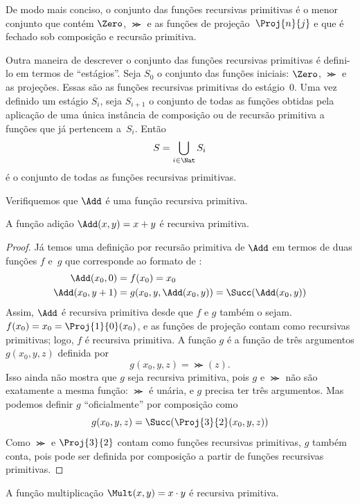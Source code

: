 \documentclass[../../../include/open-logic-section]{subfiles}
\begin{document}
\begin{explain}
De modo mais conciso, o conjunto das funções recursivas primitivas é o menor
conjunto que contém $\Zero$, $\Succ$ e as funções de
projeção~$\Proj{n}{j}$ e que é fechado sob composição e recursão primitiva.

Outra maneira de descrever o conjunto das funções recursivas primitivas é
defini-lo em termos de ``estágios''. Seja $S_0$ o conjunto das funções
iniciais: $\Zero$, $\Succ$ e as projeções. Essas são as funções recursivas
primitivas do estágio~$0$. Uma vez definido um estágio $S_i$, seja $S_{i+1}$
o conjunto de todas as funções obtidas pela aplicação de uma única instância
de composição ou de recursão primitiva a funções que já pertencem a~$S_i$.
Então
\[
S = \bigcup_{i \in \Nat} S_i
\]
é o conjunto de todas as funções recursivas primitivas.
\end{explain}

Verifiquemos que $\Add$ é uma função recursiva primitiva.

\begin{prop}
  A função adição $\Add(x,y) = x+y$ é recursiva primitiva.
\end{prop}

\begin{proof}
Já temos uma definição por recursão primitiva de $\Add$ em termos de duas
funções $f$ e~$g$ que corresponde ao formato de
:
\begin{align*}
  \Add(x_0, 0) & = f(x_0) = x_0\\
  \Add(x_0, y+1) & = g(x_0, y, \Add(x_0, y)) =
  \Succ(\Add(x_0, y))
\end{align*}
Assim, $\Add$ é recursiva primitiva desde que $f$ e $g$ também o sejam.
$f(x_0) = x_0 = \Proj{1}{0}(x_0)$, e as funções de projeção contam como
recursivas primitivas; logo, $f$ é recursiva primitiva. A função $g$ é a
função de três argumentos $g(x_0, y, z)$ definida por
\[
g(x_0, y, z) = \Succ(z).
\]
Isso ainda não mostra que $g$ seja recursiva primitiva, pois $g$ e $\Succ$
não são exatamente a mesma função: $\Succ$ é unária, e $g$ precisa ter três
argumentos. Mas podemos definir $g$ ``oficialmente'' por composição como
\[
g(x_0, y, z) = \Succ(\Proj{3}{2}(x_0, y, z))
\]
Como $\Succ$ e $\Proj{3}{2}$ contam como funções recursivas primitivas, $g$
também conta, pois pode ser definida por composição a partir de funções
recursivas primitivas.
\end{proof}

\begin{prop}
  A função multiplicação $\Mult(x,y) = x \cdot y$ é recursiva primitiva.
\end{prop}
\end{document}
